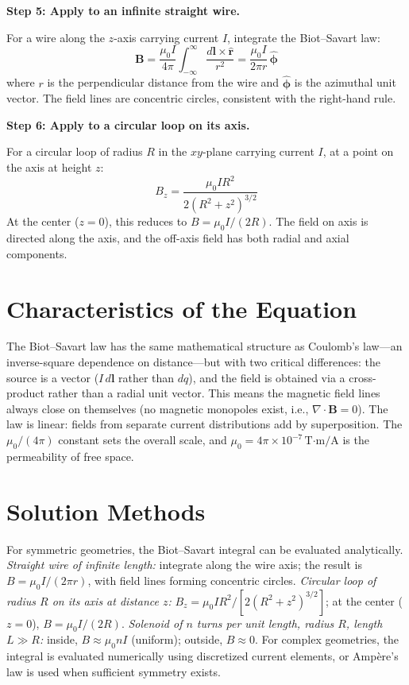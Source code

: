 \documentclass[11pt,openright]{book}
\begin{document}
\textbf{Step 5: Apply to an infinite straight wire.}

For a wire along the $z$-axis carrying current $I$, integrate the Biot--Savart law:
\begin{equation}
\mathbf{B} = \frac{\mu_0 I}{4\pi}\int_{-\infty}^{\infty}\frac{d\mathbf{l}\times\hat{\mathbf{r}}}{r^2} = \frac{\mu_0 I}{2\pi r}\,\hat{\boldsymbol{\phi}}
\end{equation}
where $r$ is the perpendicular distance from the wire and $\hat{\boldsymbol{\phi}}$ is the azimuthal unit vector. The field lines are concentric circles, consistent with the right-hand rule.

\textbf{Step 6: Apply to a circular loop on its axis.}

For a circular loop of radius $R$ in the $xy$-plane carrying current $I$, at a point on the axis at height $z$:
\begin{equation}
B_z = \frac{\mu_0 I R^2}{2(R^2 + z^2)^{3/2}}
\end{equation}
At the center ($z=0$), this reduces to $B = \mu_0 I/(2R)$. The field on axis is directed along the axis, and the off-axis field has both radial and axial components.

\section*{Characteristics of the Equation}

The Biot--Savart law has the same mathematical structure as Coulomb's law---an inverse-square dependence on distance---but with two critical differences: the source is a vector ($I\,d\mathbf{l}$ rather than $dq$), and the field is obtained via a cross-product rather than a radial unit vector. This means the magnetic field lines always close on themselves (no magnetic monopoles exist, i.e., $\nabla\cdot\mathbf{B} = 0$). The law is linear: fields from separate current distributions add by superposition. The $\mu_0/(4\pi)$ constant sets the overall scale, and $\mu_0 = 4\pi\times 10^{-7}\,\text{T·m/A}$ is the permeability of free space.
\section*{Solution Methods}

For symmetric geometries, the Biot--Savart integral can be evaluated analytically. \textit{Straight wire of infinite length:} integrate along the wire axis; the result is $B = \mu_0 I / (2\pi r)$, with field lines forming concentric circles. \textit{Circular loop of radius $R$ on its axis at distance $z$:} $B_z = \mu_0 I R^2 / [2(R^2 + z^2)^{3/2}]$; at the center ($z=0$), $B = \mu_0 I/(2R)$. \textit{Solenoid of $n$ turns per unit length, radius $R$, length $L\gg R$:} inside, $B \approx \mu_0 n I$ (uniform); outside, $B\approx 0$. For complex geometries, the integral is evaluated numerically using discretized current elements, or Ampère's law is used when sufficient symmetry exists.
\end{document}
